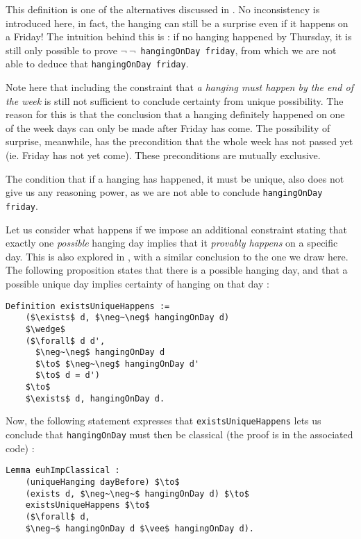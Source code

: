 \documentclass[journal]{journal}
\begin{document}
This definition is one of the alternatives discussed in \cite{fourpossible}. No inconsistency
is introduced here, in fact, the hanging can still be a surprise even if it
happens on a Friday! The intuition behind this is : if no hanging happened by
Thursday, it is still only possible to prove {\tt $\neg~\neg$~hangingOnDay friday},
from which we are not able to deduce that {\tt hangingOnDay friday}.

Note here that including the constraint that \emph{a hanging must happen
by the end of the week} is still not sufficient to conclude certainty
from unique possibility. The reason for this is that the conclusion that
a hanging definitely happened on one of the week days can only be made
after Friday has come. The possibility of surprise, meanwhile, has the
precondition that the whole week has not passed yet (ie. Friday has not yet come).
These preconditions are mutually exclusive.

The condition that if a hanging has happened, it must be unique, also does not
give us any reasoning power, as we are not able to conclude {\tt hangingOnDay friday}.

Let us consider what happens if we impose an additional constraint stating that
exactly one \emph{possible} hanging
day implies that it \emph{provably happens} on a specific day. This is also explored in
\cite{fourpossible}, with a similar conclusion to the one we draw here. The following
proposition states that there is a possible hanging day, and that a possible
unique day implies certainty of hanging on that day :

\begin{lstlisting}[mathescape=true]
  Definition existsUniqueHappens :=
    ($\exists$ d, $\neg~\neg$ hangingOnDay d)
    $\wedge$
    ($\forall$ d d',
      $\neg~\neg$ hangingOnDay d
      $\to$ $\neg~\neg$ hangingOnDay d'
      $\to$ d = d')
    $\to$
    $\exists$ d, hangingOnDay d.
\end{lstlisting}

Now, the following statement expresses that {\tt existsUniqueHappens} lets us
conclude that {\tt hangingOnDay} must then be classical (the proof is in the
associated code) :

\begin{lstlisting}[mathescape=true]
  Lemma euhImpClassical :
    (uniqueHanging dayBefore) $\to$
    (exists d, $\neg~\neg~$ hangingOnDay d) $\to$
    existsUniqueHappens $\to$
    ($\forall$ d,
    $\neg~$ hangingOnDay d $\vee$ hangingOnDay d).
\end{lstlisting}
\end{document}
